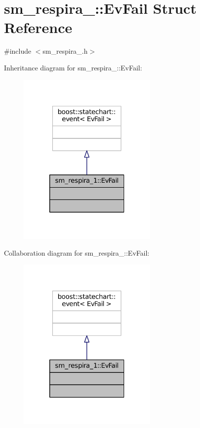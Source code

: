 \hypertarget{structsm__respira__1_1_1EvFail}{}\section{sm\+\_\+respira\+\_\+:\+:Ev\+Fail Struct Reference}
\label{structsm__respira__1_1_1EvFail}


{\ttfamily \#include $<$sm\+\_\+respira\+\_.\+h$>$}



Inheritance diagram for sm\+\_\+respira\+\_\+:\+:Ev\+Fail\+:
\nopagebreak
\begin{figure}[H]
\begin{center}
\leavevmode
\includegraphics[width=193pt]{structsm__respira__1_1_1EvFail__inherit__graph}
\end{center}
\end{figure}


Collaboration diagram for sm\+\_\+respira\+\_\+:\+:Ev\+Fail\+:
\nopagebreak
\begin{figure}[H]
\begin{center}
\leavevmode
\includegraphics[width=193pt]{structsm__respira__1_1_1EvFail__coll__graph}
\end{center}
\end{figure}


